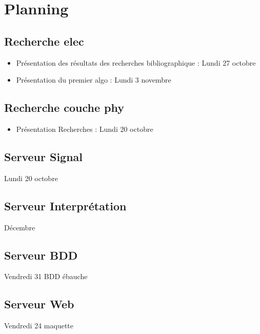 \documentclass[10pt,a4paper]{article}
\begin{document}
\section{Planning}
\subsection{Recherche elec}
\begin{itemize}
	\item Présentation des résultats des recherches bibliographique : Lundi 27 octobre
	\item Présentation du premier algo : Lundi 3 novembre
\end{itemize}
\subsection{Recherche couche phy}
\begin{itemize}
	\item Présentation Recherches : Lundi 20 octobre
\end{itemize}
\subsection{Serveur Signal}
Lundi 20 octobre
\subsection{Serveur Interprétation}
Décembre
\subsection{Serveur BDD}
Vendredi 31 BDD ébauche
\subsection{Serveur Web}
Vendredi 24 maquette
\end{document}
